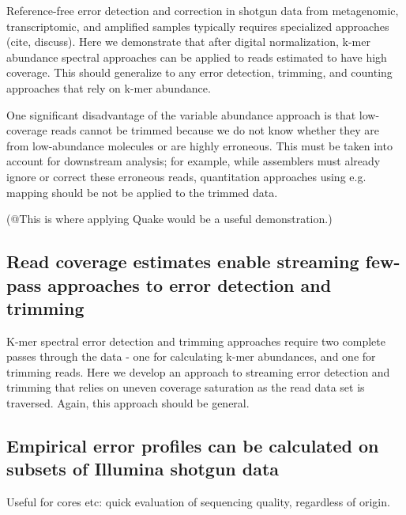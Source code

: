 Reference-free error detection and correction in shotgun data from
metagenomic, transcriptomic, and amplified samples typically requires
specialized approaches (cite, discuss).  Here we demonstrate
that after digital normalization, k-mer abundance spectral approaches
can be applied to reads estimated to have high coverage.  This should
generalize to any error detection, trimming, and counting approaches
that rely on k-mer abundance.

One significant disadvantage of the variable abundance approach is
that low-coverage reads cannot be trimmed because we do not know
whether they are from low-abundance molecules or are highly erroneous.
This must be taken into account for downstream analysis; for example,
while assemblers must already ignore or correct these erroneous reads,
quantitation approaches using e.g. mapping should be not be applied
to the trimmed data.

(@This is where applying Quake would be a useful demonstration.)


\subsection{Read coverage estimates enable streaming few-pass approaches to error detection and trimming}

K-mer spectral error detection and trimming approaches require two
complete passes through the data - one for calculating k-mer
abundances, and one for trimming reads.  Here we develop an approach
to streaming error detection and trimming that relies on uneven
coverage saturation as the read data set is traversed.  Again, this
approach should be general.



\subsection{Empirical error profiles can be calculated on subsets of Illumina shotgun data}

Useful for cores etc: quick evaluation of sequencing quality, regardless
of origin.

